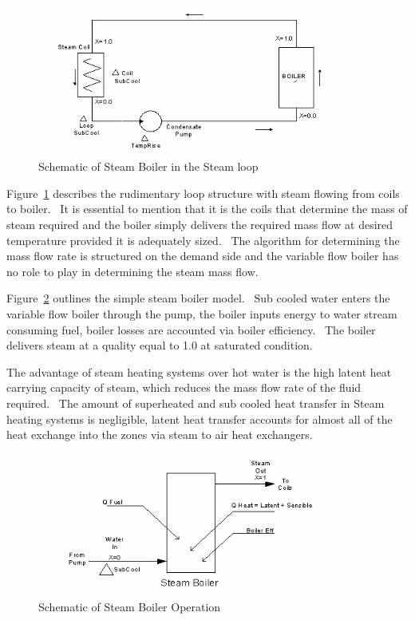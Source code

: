 \begin{figure}[hbtp] %
\centering
\includegraphics[width=0.9\textwidth, height=0.9\textheight, keepaspectratio=true]{media/image2932.png}
\caption{Schematic of Steam Boiler in the Steam loop \protect \label{fig:schematic-of-steam-boiler-in-the-steam-loop}}
\end{figure}

Figure~\ref{fig:schematic-of-steam-boiler-in-the-steam-loop} describes the rudimentary loop structure with steam flowing from coils to boiler.~ It is essential to mention that it is the coils that determine the mass of steam required and the boiler simply delivers the required mass flow at desired temperature provided it is adequately sized.~ The algorithm for determining the mass flow rate is structured on the demand side and the variable flow boiler has no role to play in determining the steam mass flow.

Figure~\ref{fig:schematic-of-steam-boiler-operation} outlines the simple steam boiler model.~ Sub cooled water enters the variable flow boiler through the pump, the boiler inputs energy to water stream consuming fuel, boiler losses are accounted via boiler efficiency.~ The boiler delivers steam at a quality equal to 1.0 at saturated condition.

The advantage of steam heating systems over hot water is the high latent heat carrying capacity of steam, which reduces the mass flow rate of the fluid required.~ The amount of superheated and sub cooled heat transfer in Steam heating systems is negligible, latent heat transfer accounts for almost all of the heat exchange into the zones via steam to air heat exchangers.

\begin{figure}[hbtp] %
\centering
\includegraphics[width=0.9\textwidth, height=0.9\textheight, keepaspectratio=true]{media/image2933.png}
\caption{Schematic of Steam Boiler Operation \protect \label{fig:schematic-of-steam-boiler-operation}}
\end{figure}


